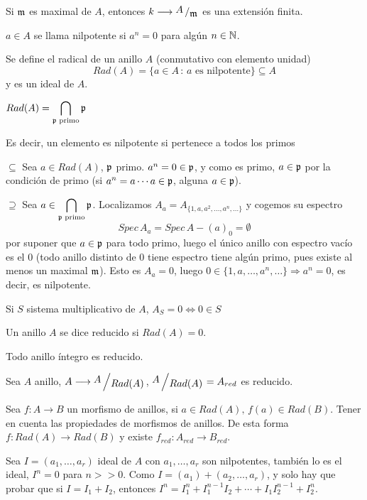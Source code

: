 \begin{teo}
    Si $\mathfrak{m}$ es maximal de $A$, entonces $k \longrightarrow \modulo{A}{\m}$ es una extensi\'on finita. 
\end{teo}
\begin{defi}
        $a\in A$ se llama nilpotente si $a^n = 0$ para alg\'un $n\in \mathbb{N}$. 

    Se define el radical de un anillo $A$ (conmutativo con elemento unidad)
    $$Rad(A) = \{a\in A \, : \, a \text{ es nilpotente}\} \subseteq A$$
    y es un ideal de $A$. 
\end{defi}
\begin{teo}
    $\displaystyle Rad(A) = \bigcap_{\mathfrak{p} \text{ primo}} \mathfrak{p} $

    Es decir, un elemento es nilpotente si pertenece a todos los primos
\end{teo}
\begin{dem}
    $\boxed{\subseteq}$ Sea $a \in Rad(A)$, $\mathfrak{p}$ primo. $a^n = 0 \in \mathfrak{p}$, y como es primo, $a\in \mathfrak{p}$ por la condici\'on de primo (si $a^n = a \cdots a \in \mathfrak{p}$, alguna $a\in \mathfrak{p}$).

    $\boxed{\supseteq}$ Sea $\displaystyle a\in \bigcap_{\mathfrak{p}\text{ primo}} \mathfrak{p}$. Localizamos $A_a = A_{\{1,a,a^2, \ldots, a^n , \ldots\}}$ y cogemos su espectro
    $$Spec\, A_a = Spec \, A - (a)_0 = \emptyset$$
    por suponer que $a \in \mathfrak{p}$ para todo primo, luego el \'unico anillo con espectro vac\'io es el 0 (todo anillo distinto de 0 tiene espectro tiene alg\'un primo, pues existe al menos un maximal $\mathfrak{m}$). Esto es $A_a = 0$, luego $0 \in\{1,a,\ldots, a^n,\ldots\} \Rightarrow a^n = 0$, es decir, es nilpotente.
\end{dem}
\begin{ejer}
    Si $S$ sistema multiplicativo de $A$, $A_S = 0 \iff 0 \in S$
\end{ejer}
\begin{defi}
    Un anillo $A$ se dice reducido si $Rad(A)=0$. 
\end{defi}
\begin{ejem}
    Todo anillo \'integro es reducido.
\end{ejem}
\begin{ejer}
    Sea $A$ anillo, $A \longrightarrow\modulo{A}{Rad(A)}$, $\modulo{A}{Rad(A)} = A_{red}$ es reducido.

    Sea $f: A \longrightarrow B$ un morfismo de anillos, si $a \in Rad(A), \, f(a) \in Rad(B)$. Tener en cuenta las propiedades de morfismos de anillos. De esta forma $f: Rad(A) \longrightarrow Rad(B)$ y existe $f_{red} : A_{red} \longrightarrow B_{red}$. 

    Sea $I = (a_1, \ldots, a_r)$ ideal de $A$ con $a_1, \ldots, a_r$ son nilpotentes, tambi\'en lo es el ideal, $I^n = 0$ para $n>>0$. Como $I = (a_1) + (a_2, \ldots, a_r)$, y solo hay que probar que si $I = I_1+I_2$, entonces $I^n = I_1^n + I_1^{n-1} I_2 + \cdots+ I_1 I_2^{n-1} + I_2^n$. 
\end{ejer}
